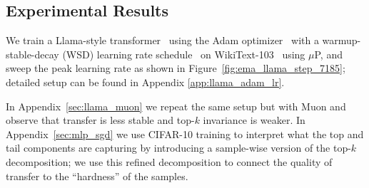 \documentclass{article} %
\begin{document}
\vspace{-1.mm}
\subsection{Experimental Results}
\label{sec:llama_adam}
\vspace{-1.mm}




We train a Llama-style transformer~\cite{touvron2023llama} using the Adam optimizer~\cite{kingma2014adam} with a warmup-stable-decay (WSD) learning rate schedule~\cite{hu2024minicpm} on WikiText-103~\cite{merity2016pointer} using $\mu$P, and sweep the peak learning rate as shown in Figure~\ref{fig:ema_llama_step_7185}; 
detailed setup can be found in Appendix \ref{app:llama_adam_lr}. 

In Appendix~\ref{sec:llama_muon} we repeat the same setup but with Muon and observe that transfer is less stable and top-$k$ invariance is weaker. In Appendix~\ref{sec:mlp_sgd} we use CIFAR-10 training to interpret what the top and tail components are capturing by introducing a sample-wise version of the top-$k$ decomposition; we use this refined decomposition to connect the quality of transfer to the ``hardness'' of the samples.  
\end{document}
